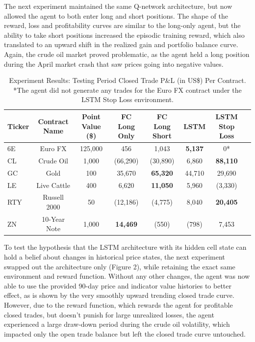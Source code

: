 \documentclass[10pt,twocolumn,letterpaper]{article}
\begin{document}
The next experiment maintained the same Q-network architecture, but now allowed the agent to both enter long and short positions. The shape of the reward, loss and profitability curves are similar to the long-only agent, but the ability to take short positions increased the episodic training reward, which also translated to an upward shift in the realized gain and portfolio balance curve. Again, the crude oil market proved problematic, as the agent held a long position during the April market crash that saw prices going into negative values.

\begin{table}
\begin{center}
\begin{tabular}{|l|c|c|c|c|c|c|c|}
\hline
Ticker & Contract Name & Point Value (\$) & FC Long Only & FC Long Short & LSTM & LSTM Stop Loss \\
\hline\hline
6E & Euro FX & 125,000 & 456 & 1,043 & \textbf{5,137} & 0* \\
CL & Crude Oil & 1,000 & (66,290) & (30,890) & 6,860 & \textbf{88,110} \\ 
GC & Gold & 100 & 35,670 & \textbf{65,320} & 44,710 & 29,690 \\
LE & Live Cattle & 400 & 6,620 & \textbf{11,050}& 5,960 & (3,330) \\
RTY & Russell 2000 & 50 & (12,186) & (4,775) & 8,040 & \textbf{20,405} \\
ZN & 10-Year Note & 1,000 & \textbf{14,469} & (550) & (798) & 7,453 \\

\hline
\end{tabular}
\end{center}
\caption{Experiment Results: Testing Period Closed Trade P\&L (in US\$) Per Contract. *The agent did not generate any trades for the Euro FX contract under the LSTM Stop Loss environment. }
\label{tab:contributions}
\end{table}

To test the hypothesis that the LSTM architecture with its hidden cell state can hold a belief about changes in historical price states, the next experiment swapped out the architecture only (Figure 2), while retaining the exact same environment and reward function. Without any other changes, the agent was now able to use the provided 90-day price and indicator value histories to better effect, as is shown by the very smoothly upward trending closed trade curve. However, due to the reward function, which rewards the agent for profitable closed trades, but doesn't punish for large unrealized losses, the agent experienced a large draw-down period during the crude oil volatility, which impacted only the open trade balance but left the closed trade curve untouched.
\end{document}
